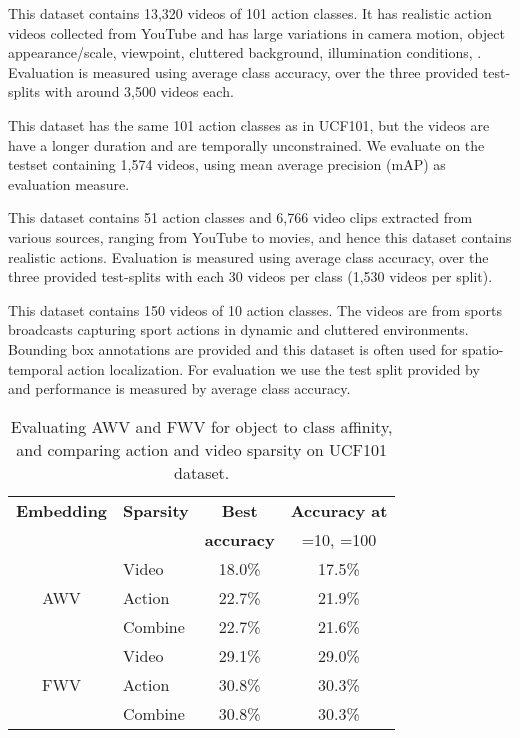 This dataset contains 13,320 videos of 101 action classes. 
It has realistic action videos collected from YouTube and has large variations in camera motion, object appearance/scale, viewpoint, cluttered background, illumination conditions, \etc. 
Evaluation is measured using average class accuracy, over the three provided test-splits with around 3,500 videos each.

This dataset has the same 101 action classes as in UCF101, but the videos are have a longer duration and are temporally unconstrained. 
We evaluate on the testset containing 1,574 videos, using mean average precision (mAP) as evaluation measure.

This dataset contains 51 action classes and 6,766 video clips extracted from various sources, ranging from YouTube to movies, and hence this dataset contains realistic actions.
Evaluation is measured using average class accuracy, over the three provided test-splits with each 30 videos per class (1,530 videos per split).

This dataset contains 150 videos of 10 action classes. 
The videos are from sports broadcasts capturing sport actions in dynamic and cluttered environments.
Bounding box annotations are provided and this dataset is often used for spatio-temporal action localization. 
For evaluation we use the test split provided by~\cite{tian_iccv11} and performance is measured by average class accuracy.

\begin{table}[t]
\centering
{\small
\begin{tabular}{| c | l | c | c | }
\hline
{\bf Embedding} & {\bf Sparsity}	&  {\bf Best }   	&   {\bf Accuracy at}   \\	
		& 			&  {\bf accuracy}	&   =10, =100 	\\ \hline	
		&	Video  		&    18.0\%		&       17.5\%	  	\\	
AWV		&	Action 		&    22.7\%		&       21.9\% 		\\		
		&	Combine		&    22.7\%		&	 21.6\%		\\	\hline	
		&	Video 	  	&    29.1\%         	&      29.0\%     	\\	
FWV		&	Action 		&    30.8\%         	&      30.3\%	 	\\		
		&	Combine    	&    30.8\%    		&    	30.3\%		\\  \hline	
\end{tabular}}
\caption{Evaluating AWV and FWV for object to class affinity, and comparing action and video sparsity on UCF101 dataset.}
\label{table:sparse_comb}
\end{table}

